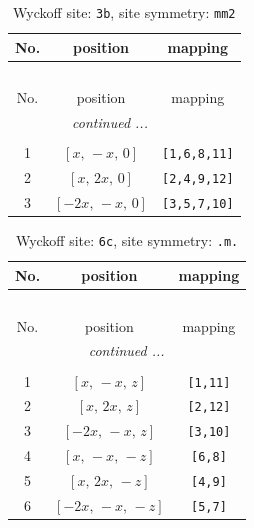 \documentclass[fleqn,8pt]{jsarticle}
\begin{document}
\begin{longtable}{ccc}
\caption{Wyckoff site: {\tt 3b}, site symmetry: {\tt mm2}}
 \\
 \hline \hline
No. & position & mapping \\ \hline \endfirsthead

\multicolumn{2}{l}{\tablename\ \thetable{}} \\
 \hline \hline
No. & position & mapping \\ \hline \endhead

 \hline \hline
\multicolumn{2}{r}{\footnotesize\it continued ...} \\ \endfoot

 \hline \hline
\multicolumn{2}{r}{} \\ \endlastfoot

1 & $\left[ x,\, - x,\, 0 \right]$ & {\tt [1,6,8,11]} \\ \hline
2 & $\left[ x,\, 2 x,\, 0 \right]$ & {\tt [2,4,9,12]} \\ \hline
3 & $\left[ - 2 x,\, - x,\, 0 \right]$ & {\tt [3,5,7,10]} \\
\end{longtable}
\renewcommand{\arraystretch}{1.2}
\begin{longtable}{ccc}
\caption{Wyckoff site: {\tt 6c}, site symmetry: {\tt .m.}}
 \\
 \hline \hline
No. & position & mapping \\ \hline \endfirsthead

\multicolumn{2}{l}{\tablename\ \thetable{}} \\
 \hline \hline
No. & position & mapping \\ \hline \endhead

 \hline \hline
\multicolumn{2}{r}{\footnotesize\it continued ...} \\ \endfoot

 \hline \hline
\multicolumn{2}{r}{} \\ \endlastfoot

1 & $\left[ x,\, - x,\, z \right]$ & {\tt [1,11]} \\ \hline
2 & $\left[ x,\, 2 x,\, z \right]$ & {\tt [2,12]} \\ \hline
3 & $\left[ - 2 x,\, - x,\, z \right]$ & {\tt [3,10]} \\ \hline
4 & $\left[ x,\, - x,\, - z \right]$ & {\tt [6,8]} \\ \hline
5 & $\left[ x,\, 2 x,\, - z \right]$ & {\tt [4,9]} \\ \hline
6 & $\left[ - 2 x,\, - x,\, - z \right]$ & {\tt [5,7]} \\
\end{longtable}
\end{document}
